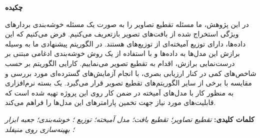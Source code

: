 \thispagestyle{empty}
\baselineskip=1.5cm
\parbox{\linewidth}{\centering \textbf{\Large{چکیده}}}
\noindent
در این پژوهش، ما مسئله تقطیع تصاویر را به صورت یک مسئله خوشه‌بندی بردارهای ویژگی استخراج شده از بافت‌های تصویر بازتعریف می‌کنیم.
فرض می‌کنیم که این داده‌ها، دارای توزیع آمیخته‌ای از توزیع‌های
هستند.
در الگوریتم پیشنهادی ما به وسیله برازش این مدل‌ها به داده‌ها و با استفاده از یک روش خوشه‌بندی ادغامی مبتنی بر درست‌نمایی برازش، اقدام به تقطیع تصویر می‌نماییم.
کارایی الگوریتم بر حسب شاخص‌های کمی در کنار ارزیابی بصری، با انجام آزمایش‌های گسترده‌ای مورد بررسی و مقایسه با برخی از سایر الگوریتم‌های تقطیع تصویر قرار می‌گیرد.
یک بسته نرم‌افزاری به منظور کار با مدل‌های آمیخته در ضمن کار روی این پروژه تهیه شده است که قابلیت‌های مورد نیاز جهت تخمین پارامترهای این مدل‌ها را فراهم می‌کند.

\vspace{1cm}
\noindent
\textbf{کلمات کلیدی:} \textit{
تقطیع تصاویر؛ تقطیع بافت؛ مدل آمیخته؛ توزیع
؛
خوشه‌بندی؛ جعبه ابزار
؛
بهینه‌سازی روی منیفلد
}

\baselineskip=1cm
